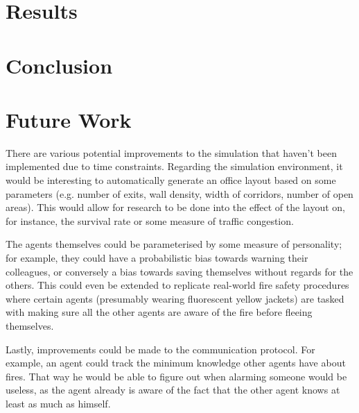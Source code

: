 \documentclass[a4paper]{article}
\begin{document}
\section{Results}

\section{Conclusion}

\section{Future Work}
There are various potential improvements to the simulation that haven't been
implemented due to time constraints. Regarding the simulation environment, it
would be interesting to automatically generate an office layout based on some
parameters (e.g. number of exits, wall density, width of corridors, number of
open areas). This would allow for research to be done into the effect of the
layout on, for instance, the survival rate or some measure of traffic congestion.

The agents themselves could be parameterised by some measure of personality; for
example, they could have a probabilistic bias towards warning their colleagues,
or conversely a bias towards saving themselves without regards for the others.
This could even be extended to replicate real-world fire safety procedures where
certain agents (presumably wearing fluorescent yellow jackets) are tasked with
making sure all the other agents are aware of the fire before fleeing themselves.

Lastly, improvements could be made to the communication protocol. For example, an agent could track the minimum knowledge other agents have about fires. That way he would be able to figure out when alarming someone would be useless, as the agent already is aware of the fact that the other agent knows at least as much as himself.
\end{document}
